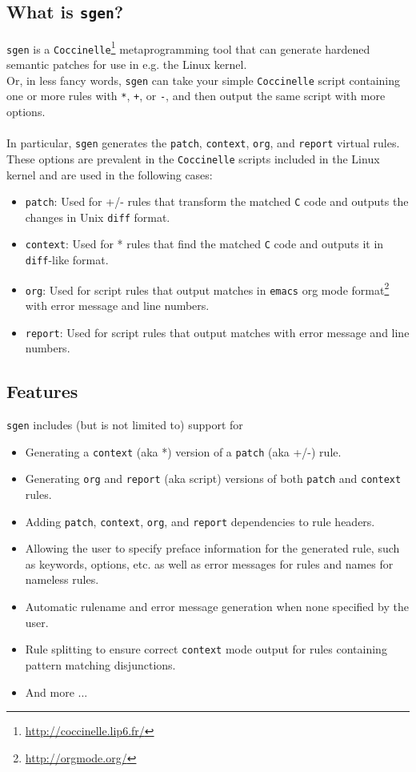 \subsection{What is \texttt{sgen}?}
\texttt{sgen} is a \texttt{Coccinelle}\footnote{\hyperref[http://coccinelle.lip6.fr/]{http://coccinelle.lip6.fr/}} metaprogramming tool that can generate hardened semantic patches for use in e.g. the Linux kernel.\\
Or, in less fancy words, \texttt{sgen} can take your simple \texttt{Coccinelle} script containing one or more rules with \texttt{*}, \texttt{+}, or \texttt{-}, and then output the same script with more options.\\\\
In particular, \texttt{sgen} generates the \texttt{patch}, \texttt{context}, \texttt{org}, and \texttt{report} virtual rules. These options are prevalent in the \texttt{Coccinelle} scripts included in the Linux kernel and are used in the following cases:
\begin{itemize}
\item \texttt{patch}: Used for +/- rules that transform the matched \texttt{C} code and outputs the changes in Unix \texttt{diff} format.
\item \texttt{context}: Used for * rules that find the matched \texttt{C} code and outputs it in \texttt{diff}-like format.
\item \texttt{org}: Used for script rules that output matches in \texttt{emacs} org mode format\footnote{\hyperref[http://orgmode.org/]{http://orgmode.org/}} with error message and line numbers.
\item \texttt{report}: Used for script rules that output matches with error message and line numbers.
\end{itemize}
\bigskip

\subsection{Features}
\texttt{sgen} includes (but is not limited to) support for
\begin{itemize}
\item Generating a \texttt{context} (aka *) version of a \texttt{patch} (aka +/-) rule.
\item Generating \texttt{org} and \texttt{report} (aka script) versions of both \texttt{patch} and \texttt{context} rules.
\item Adding \texttt{patch}, \texttt{context}, \texttt{org}, and \texttt{report} dependencies to rule headers.
\item Allowing the user to specify preface information for the generated rule, such as keywords, options, etc. as well as error messages for rules and names for nameless rules.
\item Automatic rulename and error message generation when none specified by the user.
\item Rule splitting to ensure correct \texttt{context} mode output for rules containing pattern matching disjunctions.
\item And more ...
\end{itemize}
